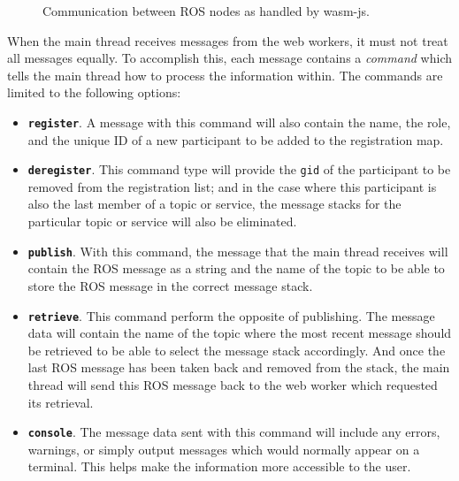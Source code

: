 \begin{figure}[htbp]
            \vspace{1em}
            \caption{Communication between \ac{ROS} nodes as handled by \textsf{wasm-js}.}
            \label{fig:webworker}
        \end{figure}

        When the main thread receives messages from the web workers, it must not treat all messages equally. To accomplish this, each message contains a \textit{command} which tells the main thread how to process the information within. The commands are limited to the following options:

        \begin{itemize}
            \item \textbf{\texttt{register}}. A message with this command will also contain the name, the role, and the unique ID of a new participant to be added to the registration map.  
            \item \textbf{\texttt{deregister}}. This command type will provide the \texttt{gid} of the participant to be removed from the registration list; and in the case where this participant is also the last member of a topic or service, the message stacks for the particular topic or service will also be eliminated.
            \item \textbf{\texttt{publish}}. With this command, the message that the main thread receives will contain the \ac{ROS} message as a string and the name of the topic to be able to store the \ac{ROS} message in the correct message stack.
            \item \textbf{\texttt{retrieve}}. This command perform the opposite of publishing. The message data will contain the name of the topic where the most recent message should be retrieved to be able to select the message stack accordingly. And once the last \ac{ROS} message has been taken back and removed from the stack, the main thread will send this \ac{ROS} message back to the web worker which requested its retrieval.
            \item \textbf{\texttt{console}}. The message data sent with this command will include any errors, warnings, or simply output messages which would normally appear on a terminal. This helps make the information more accessible to the user.
        \end{itemize}

